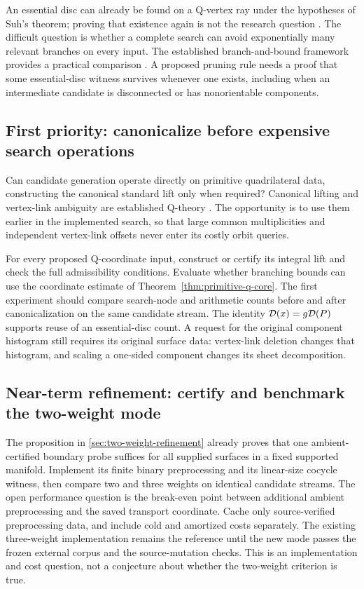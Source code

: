 An essential disc can already be found on a Q-vertex ray under the hypotheses
of Suh's theorem; proving that existence again is not the research question
\cite{Suh2010}. The difficult question is whether a complete search can avoid
exponentially many relevant branches on every input. The established
branch-and-bound framework provides a practical comparison
\cite{BurtonOzlen2014}. A proposed pruning rule needs a proof that some
essential-disc witness survives whenever one exists, including when an
intermediate candidate is disconnected or has nonorientable components.

\subsection{First priority: canonicalize before expensive search operations}

Can candidate generation operate directly on primitive quadrilateral data,
constructing the canonical standard lift only when required? Canonical
lifting and vertex-link ambiguity are established Q-theory
\cite{Tollefson1998,Burton2009}. The opportunity is to use them earlier in the
implemented search, so that large common multiplicities and independent
vertex-link offsets never enter its costly orbit queries.

For every proposed Q-coordinate input, construct or certify its integral
lift and check the full admissibility conditions. Evaluate whether branching
bounds can use the coordinate estimate of
Theorem~\ref{thm:primitive-q-core}. The first experiment should compare
search-node and arithmetic counts before and after canonicalization on the
same candidate stream. The identity $\mathcal D(x)=g\mathcal D(P)$ supports reuse of an
essential-disc count. A request for the original component histogram still
requires its original surface data: vertex-link deletion changes that
histogram, and scaling a one-sided component changes its sheet decomposition.

\subsection{Near-term refinement: certify and benchmark the two-weight mode}

The proposition in \cref{sec:two-weight-refinement} already proves that one
ambient-certified boundary probe suffices for all supplied surfaces in a
fixed supported manifold. Implement its finite binary preprocessing and its
linear-size cocycle witness, then compare two and three weights on identical
candidate streams. The open performance question is the break-even point
between additional ambient preprocessing and the saved transport coordinate.
Cache only source-verified preprocessing data, and include cold and amortized
costs separately. The existing three-weight implementation remains the
reference until the new mode passes the frozen external corpus and the
source-mutation checks. This is an implementation and cost question, not a
conjecture about whether the two-weight criterion is true.

